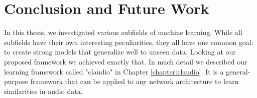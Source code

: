 
\chapter{Conclusion and Future Work}\label{chapter:conclusion}

In this thesis, we investigated various subfields of machine learning. While all subfields have their own interesting peculiarities, they all have one common goal: to create strong models that generalize well to unseen data. Looking at our proposed framework we achieved exactly that. In much detail we described our learning framework called "\gls{claudio}" in Chapter \ref{chapter:claudio}. It is a general-purpose framework that can be applied to any network architecture to learn similarities in audio data.


